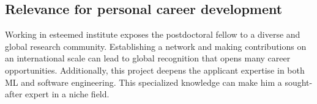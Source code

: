 \subsection{Relevance for personal career development }


Working in esteemed institute exposes the postdoctoral fellow to a diverse and global research community.
Establishing a network and making contributions on an international scale can lead to global recognition that opens many career opportunities.
%
Additionally, this project 	deepens the applicant expertise in both ML and software engineering.
This specialized knowledge can make him a sought-after expert in a niche field.